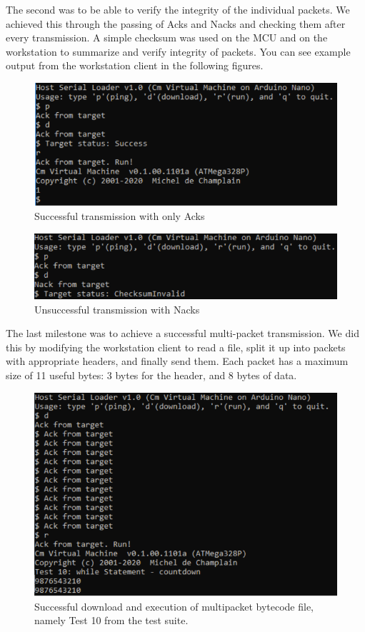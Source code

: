 \documentclass[11pt]{article}
\begin{document}
The second was to be able to verify the integrity of the individual packets.
We achieved this through the passing of Acks and Nacks and checking them after every transmission.
A simple checksum was used on the MCU and on the workstation to summarize and verify integrity of packets.
You can see example output from the workstation client in the following figures.

\begin{figure}[h!]
    \includegraphics[width=\textwidth]{report/checksum_valid.PNG}
    \caption{Successful transmission with only Acks}
\end{figure}

\begin{figure}[h!]
    \includegraphics[width=\textwidth]{report/checksum_invalid.PNG}
    \caption{Unsuccessful transmission with Nacks}
\end{figure}

The last milestone was to achieve a successful multi-packet transmission. We did this by modifying the workstation client to read a file, split it up into packets with appropriate headers, and finally send them. Each packet has a maximum size of 11 useful bytes: 3 bytes for the header, and 8 bytes of data.

\begin{figure}[h!]
    \includegraphics[width=\textwidth]{report/multipacket_run.PNG}
    \caption{Successful download and execution of multipacket bytecode file, namely Test 10 from the test suite.}
\end{figure}
\end{document}
